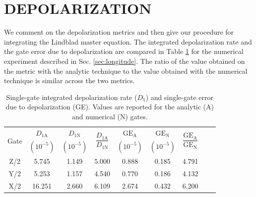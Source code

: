 \documentclass[
  amsfonts,
  amsmath,
  amssymb,
  pra,
  twocolumn,
  superscriptaddress,
]{revtex4-2}
\begin{document}
\section{DEPOLARIZATION \label{appendix:longitude}}
We comment on the depolarization metrics and then give
our procedure for integrating the Lindblad master equation.
The integrated depolarization rate and the gate error due to
depolarization
are compared in Table \ref{tab:longitude} for the
numerical experiment described in Sec. \ref{sec:longitude}.
The ratio of the value obtained on the metric with the analytic technique
to the value obtained with the numerical technique
is similar across the two metrics.

\begin{table}[ht]
  \begin{tabular}{| c | c | c | c | c | c | c | c | c |}
    \hline
    \multirow{2}{*}{Gate} &
    $D_{1\textrm{A}}$ &
    $D_{1\textrm{N}}$ &
    \multirow{2}{*}{$\dfrac{ D_{1\textrm{A}} }{ D_{1\textrm{N}} }$} &
    $\textrm{GE}_{\textrm{A}}$ &
    $\textrm{GE}_{\textrm{N}}$ &
    \multirow{2}{*}{$\dfrac{ \textrm{GE}_{\textrm{A}} }{ \textrm{GE}_{\textrm{N}} }$}\\
    &
    $(10^{-5})$ &
    $(10^{-5})$ &
    &
    $(10^{-5})$ &
    $(10^{-5})$ &\\
    \hline
    Z/2 & 5.745 & 1.149 & 5.000 & 0.888   & 0.185  & 4.791\\
    \hline
    Y/2 & 5.253 & 1.157 & 4.540 & 0.770 & 0.186   & 4.132\\
    \hline
    X/2 & 16.251 & 2.660 & 6.109 & 2.674 & 0.432  & 6.200\\
    \hline
  \end{tabular}
  \caption{
    Single-gate integrated depolarization rate ($D_{1}$)
    and single-gate error due to depolarization (GE).
    Values are reported for the analytic (A) and numerical (N) gates.
  }
  \label{tab:longitude}
\end{table}
\end{document}
